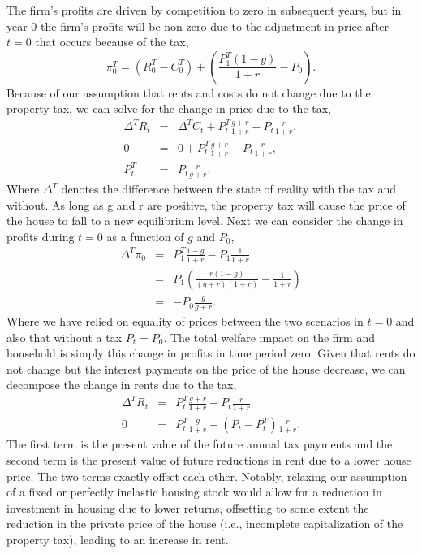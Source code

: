 \documentclass[ecta,nameyear,draft]{econsocart}
\theoremstyle{plain}
\theoremstyle{remark}
\begin{document}
The firm's profits are driven by competition to zero in subsequent years, but in year 0 the firm's profits will be non-zero due to the adjustment in price after $t=0$ that occurs because of the tax,
\begin{equation*}
	\pi^T_0 = (R^T_0-C^T_0)+\left(\frac{P^T_{1}(1-g)}{1+r}-P_0\right).\label{piT0}
\end{equation*}
Because of our assumption that rents and costs do not change due to the property tax, we can solve for the change in price due to the tax,
\begin{eqnarray}
	\Delta^T R_t&=&\Delta^T C_t+P^T_{t}\frac{g+r}{1+r}-P_{t} \frac{r}{1+r},\nonumber \\
	0&=&0+P^T_{t}\frac{g+r}{1+r}-P_{t} \frac{r}{1+r},\nonumber \\
	P^T_t&=& P_t\frac{r}{g+r}.\label{TxPrice} \label{Ptax}
\end{eqnarray}
Where $\Delta^T$ denotes the difference between the state of reality with the tax and without. As long as g and r are positive, the property tax will cause the price of the house to fall to a new equilibrium level.
Next we can consider the change in profits during $t=0$ as a function of $g$ and $P_0$,
\begin{eqnarray*}
	\Delta^T \pi_0 &=& P_1^T\frac{1-g}{1+r}-P_1\frac{1}{1+r}\\
	&=& P_1\left(\frac{r(1-g)}{(g+r)(1+r)}-\frac{1}{1+r}\right)\\
	&=&-P_0\frac{g}{g+r}.
\end{eqnarray*}
Where we have relied on equality of prices between the two scenarios in $t=0$ and also that without a tax $P_t=P_0$. The total welfare impact on the firm and household is simply this change in profits in time period zero.
Given that rents do not change but the interest payments on the price of the house decrease, we can decompose the change in rents due to the tax,
\begin{eqnarray*}
	\Delta^T R_t&=&P^T_t\frac{g+r}{1+r}-P_t\frac{r}{1+r}\\
	0&=&P^T_t\frac{g}{1+r}-(P_t-P_t^T)\frac{r}{1+r}.
\end{eqnarray*}
The first term is the present value of the future annual tax payments and the second term is the present value of future reductions in rent due to a lower house price. The two terms exactly offset each other. Notably, relaxing our assumption of a fixed or perfectly inelastic housing stock would allow for a reduction in investment in housing due to lower returns, offsetting to some extent the reduction in the private price of the house (i.e., incomplete capitalization of the property tax), leading to an increase in rent.
\end{document}
